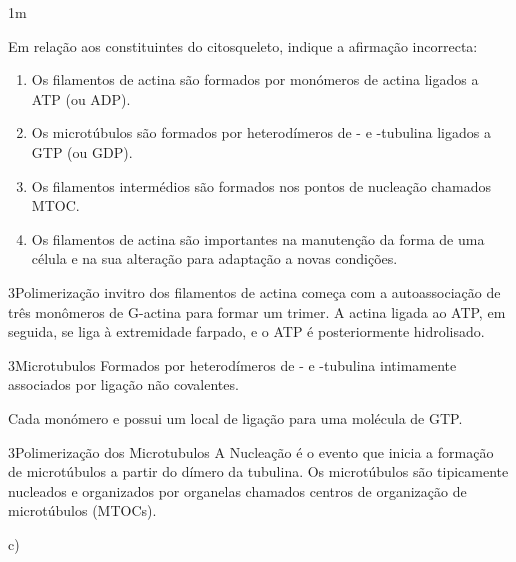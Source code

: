 \documentclass[\mainfilename]{subfiles}
\begin{document}
\begin{questionBox}1m{} %
    
    Em relação aos constituintes do citosqueleto, indique a afirmação incorrecta:

    \begin{enumerate}[label=\alph{enumi})]
        \item Os filamentos de actina são formados por monómeros de actina ligados a ATP (ou ADP).
        \item Os microtúbulos são formados por heterodímeros de \chemalpha- e \chembeta-tubulina ligados a GTP (ou GDP).
        \item Os filamentos intermédios são formados nos pontos de nucleação chamados MTOC.
        \item Os filamentos de actina são importantes na manutenção da forma de uma célula e na sua alteração para adaptação a novas condições.
    \end{enumerate}

    \begin{questionBox}3{Polimerização invitro dos filamentos de actina} %
        começa com a autoassociação de três monômeros de G-actina para formar um trimer. A actina ligada ao ATP, em seguida, se liga à extremidade farpado, e o ATP é posteriormente hidrolisado.
    \end{questionBox}

    \begin{questionBox}3{Microtubulos} %
        Formados por heterodímeros de \chemalpha- e \chembeta-tubulina intimamente associados por ligação não covalentes.

        Cada monómero \chemalpha e \chembeta possui um local de ligação para uma molécula de GTP.
    \end{questionBox}

    \begin{questionBox}3{Polimerização dos Microtubulos} %
        A Nucleação é o evento que inicia a formação de microtúbulos a partir do dímero da tubulina. Os microtúbulos são tipicamente nucleados e organizados por organelas chamados centros de organização de microtúbulos (MTOCs).
    \end{questionBox}

    \begin{answerBox}{} %
        c)
    \end{answerBox}

\end{questionBox}
\end{document}
